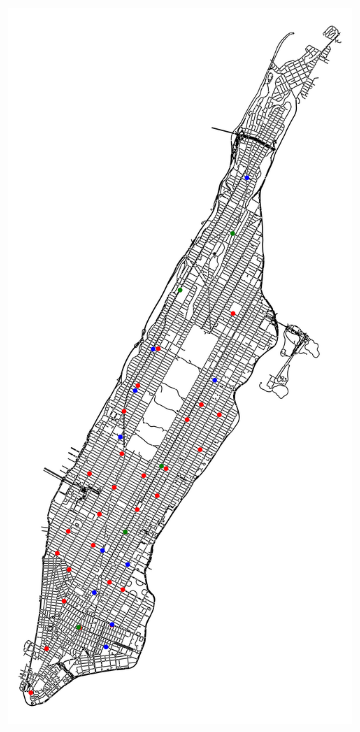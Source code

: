 \begin{figure}[tbh]
	\centering
	\begin{subfigure}[b]{0.32\textwidth}
		\centering
		\includegraphics[width=\textwidth]{assets/img/07_graph_based/new_york_vanilla_info.png}

\end{subfigure}
\end{figure}
